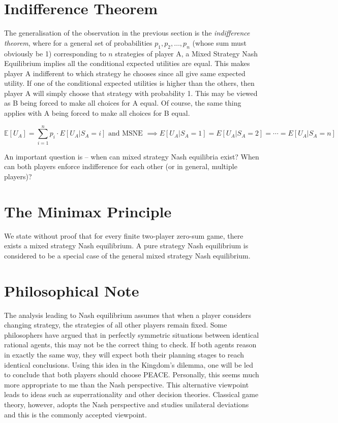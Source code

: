 \section{Indifference Theorem}
The generalisation of the observation in the previous section is the \emph{indifference theorem}, where 
for a general set of probabilities $p_1,p_2,\dots,p_n$ (whose sum must obviously be 1) corresponding 
to $n$ strategies of player A, a Mixed Strategy Nash Equilibrium implies all the 
conditional expected utilities are equal. This makes player A indifferent to which strategy 
he chooses since all give same expected utility. If one of the conditional expected utilities is higher than the others, then 
player A will simply choose that strategy with probability 1. This may be viewed as B being 
forced to make all choices for A equal. Of course, the same thing applies with A being forced 
to make all choices for B equal. 

\[
\mathbb E[U_A] = \sum_{i=1}^n p_i \cdot E[U_A | S_A = i] \text { and MSNE }
\implies 
E[U_A | S_A = 1] = E[U_A | S_A = 2] = \cdots = E[U_A | S_A = n]
\]

An important question is -- when can mixed strategy Nash equilibria exist? When can both 
players enforce indifference for each other (or in general, multiple players)?

\section{The Minimax Principle}
We state without proof that for every finite two-player zero-sum game, there 
exists a mixed strategy Nash equilibrium. A pure strategy Nash equilibrium is 
considered to be a special case of the general mixed strategy Nash equilibrium.\\

\section*{Philosophical Note}
The analysis leading to Nash equilibrium assumes that when a player considers 
changing strategy, the strategies of all other players remain fixed. Some philosophers have argued 
that in perfectly symmetric situations between identical rational agents, this may not be the 
correct thing to check. If both agents reason in exactly the same way, they will expect both their 
planning stages to reach identical conclusions. Using this idea in the Kingdom's dilemma, one will 
be led to conclude that both players should choose PEACE. Personally, this seems much more appropriate 
to me than the Nash perspective. This alternative viewpoint leads to 
ideas such as superrationality and other decision theories. Classical game theory, however, 
adopts the Nash perspective and studies unilateral deviations and this is the commonly accepted viewpoint.\\

